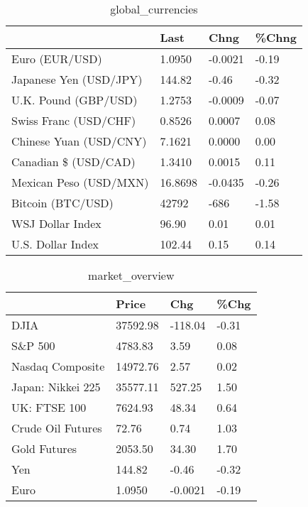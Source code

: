 \documentclass{article}%
\begin{document}
%


\begin{table}[htbp]%
\caption{global\_currencies}%
\centering%
\begin{adjustbox}{width=1\textwidth}%
\begin{tabular}{llll}
\toprule
                       &    Last &    Chng & \%Chng \\
\midrule
        Euro (EUR/USD) &  1.0950 & -0.0021 & -0.19 \\
Japanese Yen (USD/JPY) &  144.82 &   -0.46 & -0.32 \\
  U.K. Pound (GBP/USD) &  1.2753 & -0.0009 & -0.07 \\
 Swiss Franc (USD/CHF) &  0.8526 &  0.0007 &  0.08 \\
Chinese Yuan (USD/CNY) &  7.1621 &  0.0000 &  0.00 \\
  Canadian \$ (USD/CAD) &  1.3410 &  0.0015 &  0.11 \\
Mexican Peso (USD/MXN) & 16.8698 & -0.0435 & -0.26 \\
     Bitcoin (BTC/USD) &   42792 &    -686 & -1.58 \\
      WSJ Dollar Index &   96.90 &    0.01 &  0.01 \\
     U.S. Dollar Index &  102.44 &    0.15 &  0.14 \\
\bottomrule
\end{tabular}
%
\end{adjustbox}%
\end{table}

%


\begin{table}[htbp]%
\caption{market\_overview}%
\centering%
\begin{adjustbox}{width=1\textwidth}%
\begin{tabular}{llll}
\toprule
                  &    Price &     Chg &  \%Chg \\
\midrule
             DJIA & 37592.98 & -118.04 & -0.31 \\
          S\&P 500 &  4783.83 &    3.59 &  0.08 \\
 Nasdaq Composite & 14972.76 &    2.57 &  0.02 \\
Japan: Nikkei 225 & 35577.11 &  527.25 &  1.50 \\
     UK: FTSE 100 &  7624.93 &   48.34 &  0.64 \\
Crude Oil Futures &    72.76 &    0.74 &  1.03 \\
     Gold Futures &  2053.50 &   34.30 &  1.70 \\
              Yen &   144.82 &   -0.46 & -0.32 \\
             Euro &   1.0950 & -0.0021 & -0.19 \\
\bottomrule
\end{tabular}
%
\end{adjustbox}%
\end{table}

%
\end{document}
